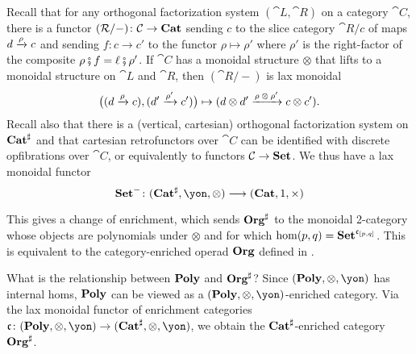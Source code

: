 Recall that for any orthogonal factorization system $(\cat{L},\cat{R})$ on a category $\cat{C}$, there is a functor $(\mathcal{R}/-)\colon\mathcal{C}\to\mathbf{Cat}$ sending $c$ to the slice category $\cat{R}/c$ of maps $d\xrightarrow[]{\textnormal{$\rho$}}c$ and sending $f\colon c\to c'$ to the functor $\rho\mapsto\rho'$ where $\rho'$ is the right-factor of the composite $\rho\mathbin{\fatsemi} f=\ell\mathbin{\fatsemi}\rho'$. If $\cat{C}$ has a monoidal structure $\otimes$ that lifts to a monoidal structure on $\cat{L}$ and $\cat{R}$, then $(\cat{R}/-)$ is lax monoidal
\[
\big((d\xrightarrow[]{\textnormal{$\rho$}}c), (d'\xrightarrow[]{\textnormal{$\rho'$}}c')\big)\mapsto (d\otimes d'\xrightarrow[]{\textnormal{$\rho\otimes\rho'$}}c\otimes c').\]
Recall also \cite[Proposition 5.52]{niu2022poly} that there is a (vertical, cartesian) orthogonal factorization system on $\mathbf{Cat}^\sharp$ and that cartesian retrofunctors over $\cat{C}$ can be identified with discrete opfibrations over $\cat{C}$, or equivalently to functors $\mathcal{C}\to\mathbf{Set}$. We thus have a lax monoidal functor
\[
\smset^-\colon(\smcat^\sharp,\yon,\otimes)\too(\smcat,1,\times)
\]

This gives a change of enrichment, which sends $\mathbf{Org}^\sharp$ to the monoidal 2-category whose objects are polynomials under $\otimes$ and for which $\hom(p,q)=\mathbf{Set}^{\mathfrak{c}_{[p,q]}}$. This is equivalent to the category-enriched operad $\mathbf{Org}$ defined in \cite[Definition 2.19]{spivak2021learnersv1}.

\begin{remark}
    What is the relationship between $\mathbf{Poly}$ and $\mathbf{Org}^\sharp$? Since $(\poly, \otimes, \yon)$ has internal homs, $\mathbf{Poly}$ can be viewed as a $(\poly, \otimes, \yon)$-enriched category. Via the lax monoidal functor of enrichment categories $\cofree\colon (\poly, \otimes, \yon) \to (\smcat^\sharp, \otimes, \yon)$, we obtain the $\mathbf{Cat}^\sharp$-enriched category $\mathbf{Org}^\sharp$.
\end{remark}

